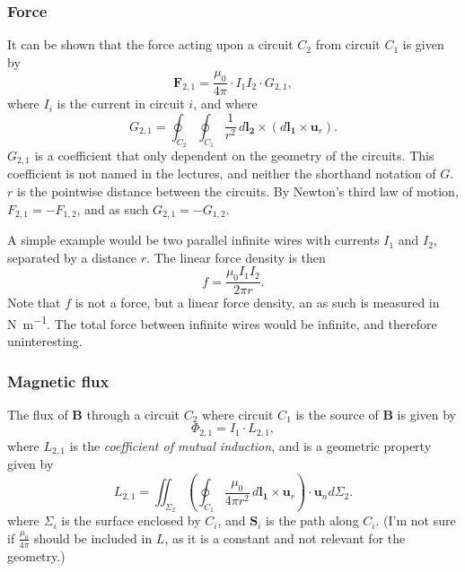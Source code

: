 \documentclass[a4paper, 12pt]{article}
\renewcommand{\vec}[1]{\mathbf{#1}}
\newcommand{\B}{\ensuremath{\vec{B}}}
\begin{document}
        \subsubsection{Force}
            It can be shown that the force acting upon a circuit $C_2$ from circuit $C_1$ is given by
            \begin{equation}
                \vec{F}_{2,1} = \frac{\mu_0}{4\pi}\cdot I_1 I_2 \cdot G_{2,1},
            \end{equation}
            where $I_i$ is the current in circuit $i$, and where 
            \begin{equation}
                G_{2,1} = \oint_{C_2} \oint_{C_1} \frac{1}{r^2}\,d\vec{l_2}\times\left(d\vec{l_1} \times \vec{u}_r\right).
            \end{equation}
            $G_{2,1}$ is a coefficient that only dependent on the geometry of the circuits. 
            This coefficient is not named in the lectures, and neither the shorthand notation of $G$.
            $r$ is the pointwise distance between the circuits. By Newton's third law of motion, 
            $F_{2,1} = -F_{1,2}$, and as such $G_{2,1} = - G_{1,2}$.

            A simple example would be two parallel infinite wires with currents $I_1$ and $I_2$, 
            separated by a distance $r$. The linear force density is then
            \begin{equation}
                f = \frac{\mu_0 I_1 I_2}{2\pi r}.
            \end{equation}
            Note that $f$ is not a force, but a linear force density, an as such is measured in \si{\newton\per\metre}. 
            The total force between infinite wires would be infinite, and therefore uninteresting.

        \subsubsection{Magnetic flux} \label{Magnetic flux}
            The flux of \B{} through a circuit $C_2$ where circuit $C_1$ is the source of \B{} is given by
            \begin{equation}
                \Phi_{2,1} = I_1 \cdot L_{2,1},
            \end{equation}
            where $L_{2,1}$ is the \textit{coefficient of mutual induction}, and is a geometric property given by
            \begin{equation}
                L_{2,1} = \iint_{\Sigma_2} \left(\oint_{C_1}\frac{\mu_0}{4\pi r^2}\,d\vec{l_1}\times \vec{u}_r \right)\cdot \vec{u}_n d\Sigma_2.
            \end{equation}
            where $\Sigma_i$ is the surface enclosed by $C_i$, and $\vec{S}_i$ is the path along $C_i$.
            (I'm not sure if $\frac{\mu_0}{4\pi}$ should be included in $L$, as it is a constant and not relevant for the geometry.)
\end{document}
